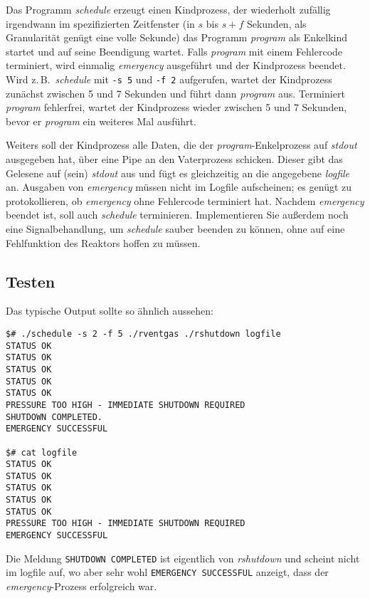 Das Programm \emph{schedule} erzeugt einen Kindprozess, der wiederholt zufällig
irgendwann im spezifizierten Zeitfenster (in $s$ bis $s+f$ Sekunden, als
Granularität genügt eine volle Sekunde) das Programm \emph{program} als
Enkelkind startet und auf seine Beendigung wartet. Falls \emph{program} mit
einem Fehlercode terminiert, wird einmalig \emph{emergency} ausgeführt und der
Kindprozess beendet. Wird z.\,B.\ \emph{schedule} mit \verb_-s 5_ und
\verb_-f 2_ aufgerufen, wartet der Kindprozess zunächst zwischen 5 und 7
Sekunden und führt dann \emph{program} aus. Terminiert \emph{program}
fehlerfrei, wartet der Kindprozess wieder zwischen 5 und 7 Sekunden, bevor er
\emph{program} ein weiteres Mal ausführt.

Weiters soll der Kindprozess alle Daten, die der \emph{program}-Enkelprozess auf
\emph{stdout} ausgegeben hat, über eine Pipe an den Vaterprozess schicken.
Dieser gibt das Gelesene auf (sein) \emph{stdout} aus und fügt es gleichzeitig
an die angegebene \emph{logfile} an. Ausgaben von \emph{emergency} müssen nicht
im Logfile aufscheinen; es genügt zu protokollieren, ob \emph{emergency} ohne
Fehlercode terminiert hat. Nachdem \emph{emergency} beendet ist, soll auch
\emph{schedule} terminieren. Implementieren Sie außerdem noch eine
Signalbehandlung, um \emph{schedule} sauber beenden zu können, ohne auf eine
Fehlfunktion des Reaktors hoffen zu müssen.

\subsection*{Testen}

Das typische Output sollte so ähnlich aussehen:
\begin{verbatim}
$# ./schedule -s 2 -f 5 ./rventgas ./rshutdown logfile
STATUS OK
STATUS OK
STATUS OK
STATUS OK
STATUS OK
PRESSURE TOO HIGH - IMMEDIATE SHUTDOWN REQUIRED
SHUTDOWN COMPLETED.
EMERGENCY SUCCESSFUL

$# cat logfile
STATUS OK
STATUS OK
STATUS OK
STATUS OK
STATUS OK
PRESSURE TOO HIGH - IMMEDIATE SHUTDOWN REQUIRED
EMERGENCY SUCCESSFUL
\end{verbatim}
Die Meldung \verb_SHUTDOWN COMPLETED_ ist eigentlich von \emph{rshutdown} und
scheint nicht im logfile auf, wo aber sehr wohl \verb_EMERGENCY SUCCESSFUL_
anzeigt, dass der \emph{emergency}-Prozess erfolgreich war.

\osueguidelinestwo


